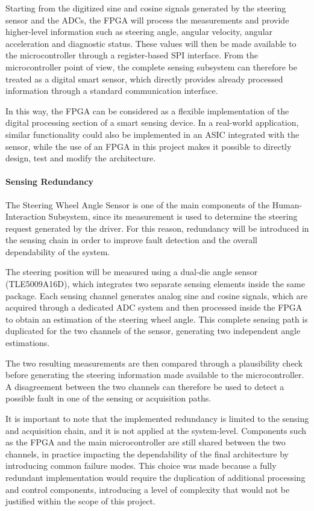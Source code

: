 Starting from the digitized sine and cosine signals generated by the steering sensor and the ADCs, the FPGA will process the measurements and provide higher-level information such as steering angle, angular velocity, angular acceleration and diagnostic status. These values will then be made available to the microcontroller through a register-based SPI interface. From the microcontroller point of view, the complete sensing subsystem can therefore be treated as a digital smart sensor, which directly provides already processed information through a standard communication interface.

In this way, the FPGA can be considered as a flexible implementation of the digital processing section of a smart sensing device. In a real-world application, similar functionality could also be implemented in an ASIC integrated with the sensor, while the use of an FPGA in this project makes it possible to directly design, test and modify the architecture.

\paragraph{Sensing Redundancy}
The Steering Wheel Angle Sensor is one of the main components of the Human-Interaction Subsystem, since its measurement is used to determine the steering request generated by the driver. For this reason, redundancy will be introduced in the sensing chain in order to improve fault detection and the overall dependability of the system.

The steering position will be measured using a dual-die angle sensor (TLE5009A16D), which integrates two separate sensing elements inside the same package. Each sensing channel generates analog sine and cosine signals, which are acquired through a dedicated ADC system and then processed inside the FPGA to obtain an estimation of the steering wheel angle. This complete sensing path is duplicated for the two channels of the sensor, generating two independent angle estimations.

The two resulting measurements are then compared through a plausibility check before generating the steering information made available to the microcontroller. A disagreement between the two channels can therefore be used to detect a possible fault in one of the sensing or acquisition paths.

It is important to note that the implemented redundancy is limited to the sensing and acquisition chain, and it is not applied at the system-level. Components such as the FPGA and the main microcontroller are still shared between the two channels, in practice impacting the dependability of the final architecture by introducing common failure modes. This choice was made because a fully redundant implementation would require the duplication of additional processing and control components, introducing a level of complexity that would not be justified within the scope of this project.


